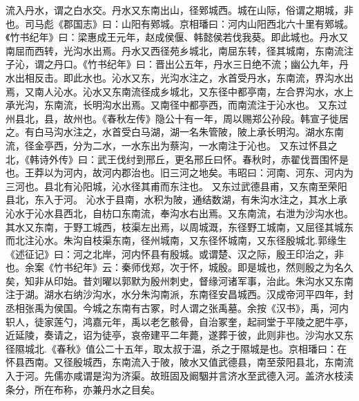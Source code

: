 \documentclass[12pt,UTF8]{ctexbook}
\begin{document}
流入丹水，谓之白水交。丹水又东南出山，径鄈城西。城在山际，俗谓之期城，非也。司马彪《郡国志》曰：山阳有鄈城。京相璠曰：河内山阳西北六十里有鄈城。《竹书纪年》曰：梁惠成王元年，赵成侯偃、韩懿侯若伐我葵。即此城也。丹水又南屈而西转，光沟水出焉。丹水又西径苑乡城北，南屈东转，径其城南，东南流注子沁，谓之丹口。《竹书纪年》曰：晋出公五年，丹水三日绝不流；幽公九年，丹水出相反击。即此水也。沁水又东，光沟水注之，水首受丹水，东南流，界沟水出焉，又南人沁水。沁水又东南流径成乡城北，又东径中都亭南，左合界沟水，水上承光沟，东南流，长明沟水出焉。又南径中都亭西，而南流注于沁水也。
又东过州县北，县，故州也。《春秋左传》隐公十有一年，周以赐郑公孙段。韩宣子徙居之。有白马沟水注之，水首受白马湖，湖一名朱管陂，陂上承长明沟。湖水东南流，径金亭西，分为二水，一水东出为蔡沟，一水南注于沁也。
又东过怀县之北，《韩诗外传》曰：武王伐纣到邢丘，更名邢丘曰怀。春秋时，赤翟伐晋围怀是也。王莽以为河内，故河内郡治也。旧三河之地矣。韦昭曰：河南、河东、河内为三河也。县北有沁阳城，沁水径其甫而东注也。
又东过武德县甫，又东南至荣阳县北，东入于河。
沁水于县南，水积为陂，通结数湖，有朱沟水注之，其水上承沁水于沁水县西北，自枋口东南流，奉沟水右出焉。又东南流，右泄为沙沟水也。其水又东南，于野工城西，枝渠左出焉，以周城溉，东径野工城南，又屈径其城东而北注沁水。朱沟自枝渠东南，径州城南，又东径怀城南，又东径殷城北.郭缘生《述征记》曰：河之北岸，河内怀县有殷城。或谓楚、汉之际，殷王印治之，非也。余案《竹书纪年》云：秦师伐郑，次于怀，城殷。即是城也，然则殷之为名久矣，知非从印始。昔刘曜以郭默为殷州刺史，督缘河诸军事，治此。朱沟水又东南注于湖。湖水右纳沙沟水，水分朱沟南派，东南径安昌城西。汉成帝河平四年，封丞相张禹为侯国。今城之东南有古冢，时人谓之张禹墓。余按《汉书》，禹，河内轵人，徒家莲勺，鸿嘉元年，禹以老乞骸骨，自治冢奎，起祠堂于平陵之肥牛亭，近延陵，奏请之，诏为徒亭，哀帝建平二年薨，遂葬于彼，此则非也。沙沟水又东径隰城北.《春秋》值公二十五年，取太叔于温，杀之于隰城是也。京相璠曰：在怀县西南。又径殷城西，东南流入于陂，陂水又值武德县，南至荥阳县北，东南流入于河。先儒亦咸谓是沟为济渠。故班固及阚駰并言济水至武德入河。盖济水枝渎条分，所在布称，亦兼丹水之目矣。
\end{document}
